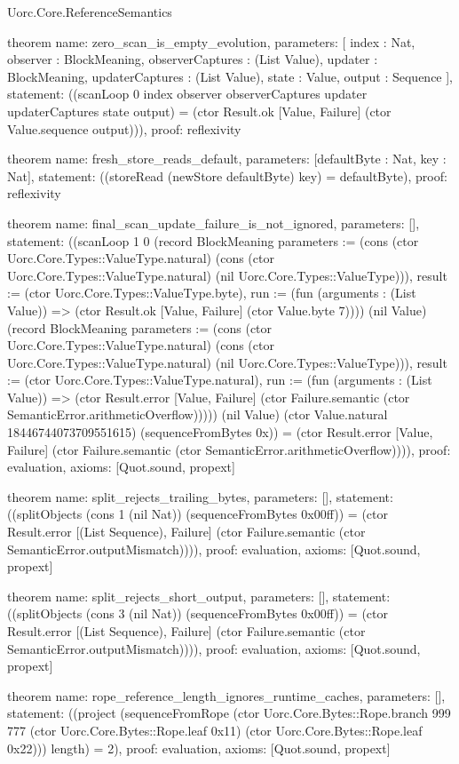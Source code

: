 \begin{lexlean}{Uorc.Core.ReferenceSemantics}
\begin{semanticmodule}
theorem{
  name: zero_scan_is_empty_evolution,
  parameters: [
    index : Nat,
    observer : BlockMeaning,
    observerCaptures : (List Value),
    updater : BlockMeaning,
    updaterCaptures : (List Value),
    state : Value,
    output : Sequence
  ],
  statement: ((scanLoop 0 index observer observerCaptures updater updaterCaptures state output) = (ctor Result.ok [Value, Failure] (ctor Value.sequence output))),
  proof: reflexivity{}
}

theorem{
  name: fresh_store_reads_default,
  parameters: [defaultByte : Nat, key : Nat],
  statement: ((storeRead (newStore defaultByte) key) = defaultByte),
  proof: reflexivity{}
}

theorem{
  name: final_scan_update_failure_is_not_ignored,
  parameters: [],
  statement: ((scanLoop 1 0 (record BlockMeaning {parameters := (cons (ctor Uorc.Core.Types::ValueType.natural) (cons (ctor Uorc.Core.Types::ValueType.natural) (nil Uorc.Core.Types::ValueType))), result := (ctor Uorc.Core.Types::ValueType.byte), run := (fun (arguments : (List Value)) => (ctor Result.ok [Value, Failure] (ctor Value.byte 7)))}) (nil Value) (record BlockMeaning {parameters := (cons (ctor Uorc.Core.Types::ValueType.natural) (cons (ctor Uorc.Core.Types::ValueType.natural) (nil Uorc.Core.Types::ValueType))), result := (ctor Uorc.Core.Types::ValueType.natural), run := (fun (arguments : (List Value)) => (ctor Result.error [Value, Failure] (ctor Failure.semantic (ctor SemanticError.arithmeticOverflow))))}) (nil Value) (ctor Value.natural 18446744073709551615) (sequenceFromBytes 0x)) = (ctor Result.error [Value, Failure] (ctor Failure.semantic (ctor SemanticError.arithmeticOverflow)))),
  proof: evaluation{},
  axioms: [Quot.sound, propext]
}

theorem{
  name: split_rejects_trailing_bytes,
  parameters: [],
  statement: ((splitObjects (cons 1 (nil Nat)) (sequenceFromBytes 0x00ff)) = (ctor Result.error [(List Sequence), Failure] (ctor Failure.semantic (ctor SemanticError.outputMismatch)))),
  proof: evaluation{},
  axioms: [Quot.sound, propext]
}

theorem{
  name: split_rejects_short_output,
  parameters: [],
  statement: ((splitObjects (cons 3 (nil Nat)) (sequenceFromBytes 0x00ff)) = (ctor Result.error [(List Sequence), Failure] (ctor Failure.semantic (ctor SemanticError.outputMismatch)))),
  proof: evaluation{},
  axioms: [Quot.sound, propext]
}

theorem{
  name: rope_reference_length_ignores_runtime_caches,
  parameters: [],
  statement: ((project (sequenceFromRope (ctor Uorc.Core.Bytes::Rope.branch 999 777 (ctor Uorc.Core.Bytes::Rope.leaf 0x11) (ctor Uorc.Core.Bytes::Rope.leaf 0x22))) length) = 2),
  proof: evaluation{},
  axioms: [Quot.sound, propext]
}


\end{semanticmodule}
\end{lexlean}
